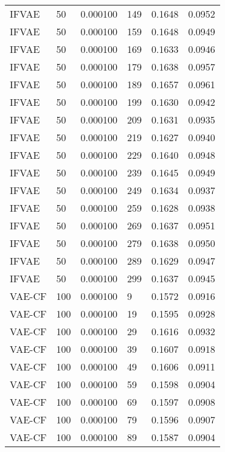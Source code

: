 \begin{tabular}{llrlrr}
   IFVAE &   50 &  0.000100 &   149 &  0.1648 &       0.0952 \\
   IFVAE &   50 &  0.000100 &   159 &  0.1648 &       0.0949 \\
   IFVAE &   50 &  0.000100 &   169 &  0.1633 &       0.0946 \\
   IFVAE &   50 &  0.000100 &   179 &  0.1638 &       0.0957 \\
   IFVAE &   50 &  0.000100 &   189 &  0.1657 &       0.0961 \\
   IFVAE &   50 &  0.000100 &   199 &  0.1630 &       0.0942 \\
   IFVAE &   50 &  0.000100 &   209 &  0.1631 &       0.0935 \\
   IFVAE &   50 &  0.000100 &   219 &  0.1627 &       0.0940 \\
   IFVAE &   50 &  0.000100 &   229 &  0.1640 &       0.0948 \\
   IFVAE &   50 &  0.000100 &   239 &  0.1645 &       0.0949 \\
   IFVAE &   50 &  0.000100 &   249 &  0.1634 &       0.0937 \\
   IFVAE &   50 &  0.000100 &   259 &  0.1628 &       0.0938 \\
   IFVAE &   50 &  0.000100 &   269 &  0.1637 &       0.0951 \\
   IFVAE &   50 &  0.000100 &   279 &  0.1638 &       0.0950 \\
   IFVAE &   50 &  0.000100 &   289 &  0.1629 &       0.0947 \\
   IFVAE &   50 &  0.000100 &   299 &  0.1637 &       0.0945 \\
  VAE-CF &  100 &  0.000100 &     9 &  0.1572 &       0.0916 \\
  VAE-CF &  100 &  0.000100 &    19 &  0.1595 &       0.0928 \\
  VAE-CF &  100 &  0.000100 &    29 &  0.1616 &       0.0932 \\
  VAE-CF &  100 &  0.000100 &    39 &  0.1607 &       0.0918 \\
  VAE-CF &  100 &  0.000100 &    49 &  0.1606 &       0.0911 \\
  VAE-CF &  100 &  0.000100 &    59 &  0.1598 &       0.0904 \\
  VAE-CF &  100 &  0.000100 &    69 &  0.1597 &       0.0908 \\
  VAE-CF &  100 &  0.000100 &    79 &  0.1596 &       0.0907 \\
  VAE-CF &  100 &  0.000100 &    89 &  0.1587 &       0.0904 \\

\end{tabular}
